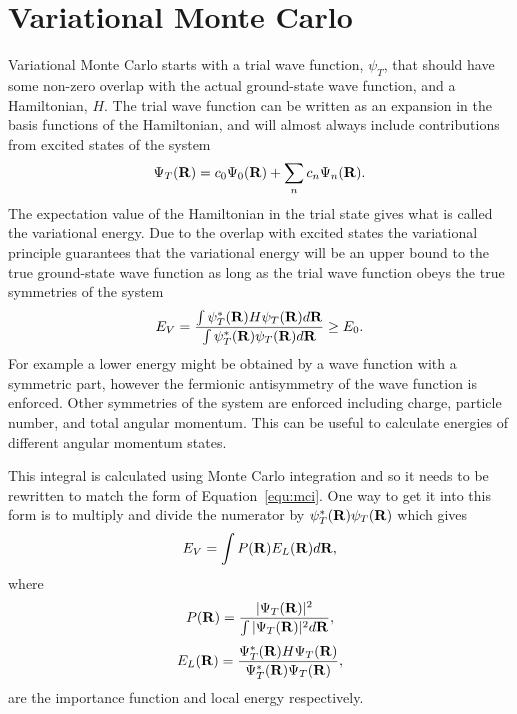 \section{Variational Monte Carlo}
Variational Monte Carlo starts with a trial wave function, $\psi_T$, that should have some non-zero overlap with the actual ground-state wave function, and a Hamiltonian, $H$. The trial wave function can be written as an expansion in the basis functions of the Hamiltonian, and will almost always include contributions from excited states of the system
\begin{equation}
   \Psi_T(\mathbf{R}) = c_0\Psi_0(\mathbf{R}) + \sum\limits_n c_n \Psi_n(\mathbf{R}).
\end{equation}
The expectation value of the Hamiltonian in the trial state gives what is called the variational energy. Due to the overlap with excited states the variational principle guarantees that the variational energy will be an upper bound to the true ground-state wave function as long as the trial wave function obeys the true symmetries of the system
\begin{equation}
   E_V = \frac{\int\psi_T^*(\mathbf{R})H\psi_T(\mathbf{R})d\mathbf{R}}{\int\psi_T^*(\mathbf{R})\psi_T(\mathbf{R})d\mathbf{R}} \ge E_0.
\end{equation}
For example a lower energy might be obtained by a wave function with a symmetric part, however the fermionic antisymmetry of the wave function is enforced. Other symmetries of the system are enforced including charge, particle number, and total angular momentum. This can be useful to calculate energies of different angular momentum states.


This integral is calculated using Monte Carlo integration and so it needs to be rewritten to match the form of Equation~\ref{equ:mci}. One way to get it into this form is to multiply and divide the numerator by $\psi_T^*(\mathbf{R})\psi_T(\mathbf{R})$ which gives
\begin{equation} 
  E_V = \int P(\mathbf{R}) E_L(\mathbf{R}) d\mathbf{R},
\end{equation}
where
\begin{equation}
   P(\mathbf{R}) = \frac{|\Psi_T(\mathbf{R})|^2}{\int|\Psi_T(\mathbf{R})|^2d\mathbf{R}},
\end{equation}
\begin{equation}
   E_L(\R) = \frac{\Psi_T^*(\R)H\Psi_T(\R)}{\Psi_T^*(\R)\Psi_T(\R)},%
\end{equation}
are the importance function and local energy respectively.

